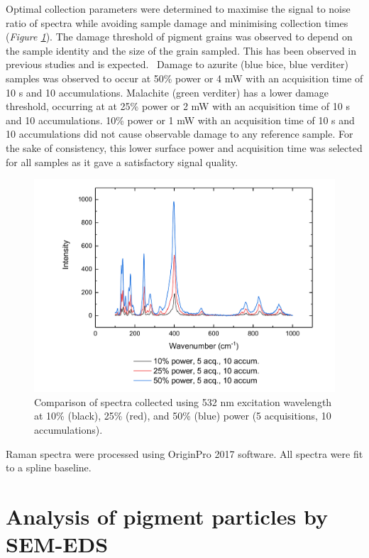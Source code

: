 Optimal collection parameters were determined to maximise the signal to noise ratio of spectra while avoiding sample damage and minimising collection times (\textit{Figure \ref{fig:Az1_laserpower_comp_532}}). The damage threshold of pigment grains was observed to depend on the sample identity and the size of the grain sampled. This has been observed in previous studies and is expected.~\autocite{Cardell,Mattei} Damage to azurite (blue bice, blue verditer) samples was observed to occur at 50\% power or 4 mW with an acquisition time of 10 s and 10 accumulations. Malachite (green verditer) has a lower damage threshold, occurring at at 25\% power or 2 mW with an acquisition time of 10 s and 10 accumulations. 10\% power or 1 mW with an acquisition time of 10 s and 10 accumulations did not cause observable damage to any reference sample. For the sake of consistency, this lower surface power and acquisition time was selected for all samples as it gave a satisfactory signal quality. 

\begin{figure}[H]
\centering
  \includegraphics[width=0.75\linewidth]{Az1_laserpower_comp_532}
\caption[Comparison of spectra collected using 532 nm excitation wavelength at 10\%, 25\%, and 50\% power.]{Comparison of spectra collected using 532 nm excitation wavelength at 10\% (black), 25\% (red), and 50\% (blue) power (5 acquisitions, 10 accumulations).}
\label{fig:Az1_laserpower_comp_532}
\end{figure}

Raman spectra were processed using OriginPro 2017 software. All spectra were fit to a spline baseline. %

\section[Analysis of pigment particles by SEM-EDS]{Analysis of pigment particles by SEM-EDS}
\label{section2.3}

